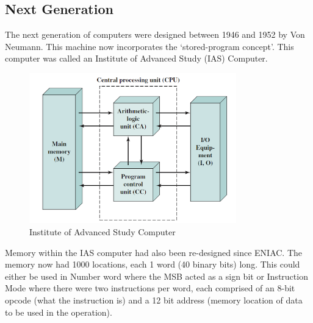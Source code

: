 \subsection{Next Generation}
The next generation of computers were designed between 1946 and 1952 by Von Neumann. This machine now incorporates the `stored-program concept'. This computer was called an Institute of Advanced Study (IAS) Computer.
\begin{figure}[H]
    \centering
    \includegraphics[width=0.8\textwidth]{assets/ias-computer.png}
    \caption{Institute of Advanced Study Computer}
\end{figure}
Memory within the IAS computer had also been re-designed since ENIAC. The memory now had 1000 locations, each 1 word (40 binary bits) long. This could either be used in Number word where the MSB acted as a sign bit or Instruction Mode where there were two instructions per word, each comprised of an 8-bit opcode (what the instruction is) and a 12 bit address (memory location of data to be used in the operation).